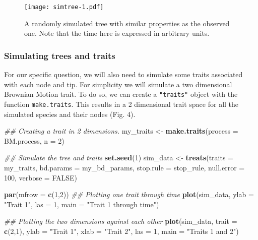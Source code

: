 \documentclass[
]{article}
\newenvironment{Shaded}{\begin{snugshade}}{\end{snugshade}}
\newcommand{\CommentTok}[1]{\textcolor[rgb]{0.56,0.35,0.01}{\textit{#1}}}
\newcommand{\DataTypeTok}[1]{\textcolor[rgb]{0.13,0.29,0.53}{#1}}
\newcommand{\DecValTok}[1]{\textcolor[rgb]{0.00,0.00,0.81}{#1}}
\newcommand{\KeywordTok}[1]{\textcolor[rgb]{0.13,0.29,0.53}{\textbf{#1}}}
\newcommand{\NormalTok}[1]{#1}
\newcommand{\OtherTok}[1]{\textcolor[rgb]{0.56,0.35,0.01}{#1}}
\newcommand{\StringTok}[1]{\textcolor[rgb]{0.31,0.60,0.02}{#1}}
\begin{document}
\begin{figure}
\centering
\texttt{[image: simtree-1.pdf]}
\caption{A randomly simulated tree with similar properties as the
observed one. Note that the time here is expressed in arbitrary units.}
\end{figure}

\hypertarget{simulating-trees-and-traits}{%
\subsubsection{Simulating trees and
traits}\label{simulating-trees-and-traits}}

For our specific question, we will also need to simulate some traits
associated with each node and tip. For simplicity we will simulate a two
dimensional Brownian Motion trait. To do so, we can create a
\texttt{"traits"} object with the function \texttt{make.traits}. This
results in a 2 dimensional trait space for all the simulated species and
their nodes (Fig. 4).

\begin{Shaded}
\begin{Highlighting}[]
\CommentTok{\#\# Creating a trait in 2 dimensions.}
\NormalTok{my\_traits \textless{}{-}}\StringTok{ }\KeywordTok{make.traits}\NormalTok{(}\DataTypeTok{process =}\NormalTok{ BM.process, }\DataTypeTok{n =} \DecValTok{2}\NormalTok{)}

\CommentTok{\#\# Simulate the tree and traits}
\KeywordTok{set.seed}\NormalTok{(}\DecValTok{1}\NormalTok{)}
\NormalTok{sim\_data \textless{}{-}}\StringTok{ }\KeywordTok{treats}\NormalTok{(}\DataTypeTok{traits     =}\NormalTok{ my\_traits,}
                   \DataTypeTok{bd.params  =}\NormalTok{ my\_bd\_params,}
                   \DataTypeTok{stop.rule  =}\NormalTok{ stop\_rule,}
                   \DataTypeTok{null.error =} \DecValTok{100}\NormalTok{,}
                   \DataTypeTok{verbose    =} \OtherTok{FALSE}\NormalTok{)}
\end{Highlighting}
\end{Shaded}

\begin{Shaded}
\begin{Highlighting}[]
\KeywordTok{par}\NormalTok{(}\DataTypeTok{mfrow =} \KeywordTok{c}\NormalTok{(}\DecValTok{1}\NormalTok{,}\DecValTok{2}\NormalTok{))}
\CommentTok{\#\# Plotting one trait through time}
\KeywordTok{plot}\NormalTok{(sim\_data, }\DataTypeTok{ylab =} \StringTok{"Trait 1"}\NormalTok{, }\DataTypeTok{las =} \DecValTok{1}\NormalTok{, }\DataTypeTok{main =} \StringTok{"Trait 1 through time"}\NormalTok{)}

\CommentTok{\#\# Plotting the two dimensions against each other}
\KeywordTok{plot}\NormalTok{(sim\_data, }\DataTypeTok{trait =} \KeywordTok{c}\NormalTok{(}\DecValTok{2}\NormalTok{,}\DecValTok{1}\NormalTok{), }\DataTypeTok{ylab =} \StringTok{"Trait 1"}\NormalTok{, }\DataTypeTok{xlab =} \StringTok{"Trait 2"}\NormalTok{, }\DataTypeTok{las =} \DecValTok{1}\NormalTok{, }\DataTypeTok{main =} \StringTok{"Traits 1 and 2"}\NormalTok{)}
\end{Highlighting}
\end{Shaded}
\end{document}
